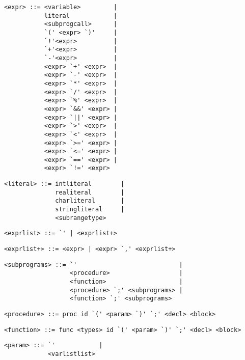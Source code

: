\begin{footnotesize}
\begin{lstlisting}[frame=single]
<expr> ::= <variable>         |
           literal            |
           <subprogcall>      |
           `(' <expr> `)'     |
           `!'<expr>          |
           `+'<expr>          |
           `-'<expr>          |
           <expr> `+' <expr>  |
           <expr> `-' <expr>  |
           <expr> `*' <expr>  |
           <expr> `/' <expr>  |
           <expr> `%' <expr>  |
           <expr> `&&' <expr> |
           <expr> `||' <expr> |
           <expr> `>' <expr>  |
           <expr> `<' <expr>  |
           <expr> `>=' <expr> |
           <expr> `<=' <expr> |
           <expr> `==' <expr> |
           <expr> `!=' <expr>
\end{lstlisting}

\begin{lstlisting}[frame=single]
<literal> ::= intliteral        | 
              realiteral        | 
              charliteral       |
              stringliteral     |
              <subrangetype>
\end{lstlisting}

\begin{lstlisting}[frame=single]
<exprlist> ::= `' | <exprlist+>
\end{lstlisting}

\begin{lstlisting}[frame=single]
<exprlist+> ::= <expr> | <expr> `,' <exprlist+>
\end{lstlisting}

\begin{lstlisting}[frame=single]
<subprograms> ::= `'                            |
                  <procedure>                   |
                  <function>                    |
                  <procedure> `;' <subprograms> |
                  <function> `;' <subprograms>
\end{lstlisting}

\begin{lstlisting}[frame=single]
<procedure> ::= proc id `(' <param> `)' `;' <decl> <block> 
\end{lstlisting}

\begin{lstlisting}[frame=single]
<function> ::= func <types> id `(' <param> `)' `;' <decl> <block>
\end{lstlisting}

\begin{lstlisting}[frame=single]
<param> ::= `'            |
            <varlistlist>
\end{lstlisting}


\end{footnotesize}

